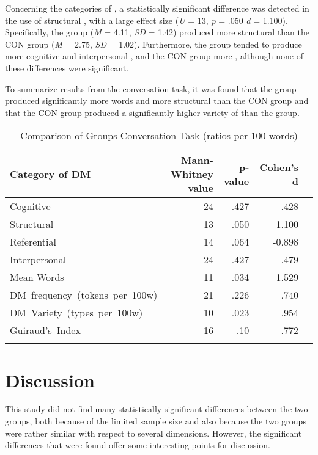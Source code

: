 \documentclass[output=paper]{langsci/langscibook}
\begin{document}
\newpage 
Concerning the categories of , a statistically significant difference was detected in the use of structural , with a large effect size (\textit{U} = 13, \textit{p} = .050 \textit{d} = 1.100). Specifically, the  group (\textit{M} = 4.11, \textit{SD} = 1.42) produced more structural  than the CON group (\textit{M} = 2.75, \textit{SD} = 1.02). Furthermore, the  group tended to produce more cognitive and interpersonal , and the CON group more  , although none of these differences were significant. 

To summarize results from the conversation task, it was found that the  group produced significantly more words and more structural  than the CON group and that the CON group produced a significantly higher variety of  than the  group. 


\begin{table}[t]
\caption{\label{tab:ament:12} Comparison of Groups Conversation Task (ratios per 100 words)}
\begin{tabularx}{\textwidth}{Qrrrr}
\lsptoprule
\bfseries Category of DM & \bfseries {Mann-Whitney value} & \bfseries {p-value}  & \bfseries {Cohen’s d} \\
\midrule 
{Cognitive} &  24 &  .427 & {} .428\\
{Structural} &  13 &  .050 & {} 1.100\\
{Referential} &  14 &  .064 & { -0}.898\\
{Interpersonal} &  24 & .427 & {} .479\\
{Mean Words}  &  11 & .034 & {} 1.529\\
\mbox{DM frequency (tokens per 100w)}   &  21 & .226 & {} .740\\
\mbox{DM Variety (types per 100w)}  &  10 & .023 & {} .954\\
\mbox{Guiraud’s Index} & {16} & {.10} & {}.772\\
\lspbottomrule
\end{tabularx}
\end{table}


\section{Discussion}

This study did not find many statistically significant differences between the two groups, both because of the limited sample size and also because the two groups were rather similar with respect to several dimensions. However, the significant differences that were found offer some interesting points for discussion.
\end{document}
